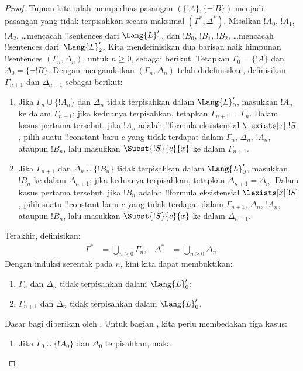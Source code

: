 \documentclass[../../../include/open-logic-section]{subfiles}
\begin{document}
\begin{proof}
Tujuan kita ialah memperluas pasangan $(\{ !A \}, \{\lnot!B\})$ menjadi
pasangan yang tidak terpisahkan secara maksimal $(\Gamma^*, \Delta^*)$.
Misalkan $!A_0$, $!A_1$, $!A_2$, \dots mencacah !!{sentence}s dari
$\Lang{L}'_1$, dan $!B_0$, $!B_1$, $!B_2$, \dots mencacah
!!{sentence}s dari~$\Lang{L}'_2$. Kita mendefinisikan dua barisan naik
himpunan !!{sentence}s $(\Gamma_n, \Delta_n)$, untuk $n \ge 0$, sebagai
berikut. Tetapkan $\Gamma_0 = \{ !A\}$ dan $\Delta_0 = \{\lnot !B \}$.
Dengan mengandaikan $(\Gamma_n, \Delta_n)$ telah didefinisikan, definisikan
$\Gamma_{n+1}$ dan $\Delta_{n+1}$ sebagai berikut:
\begin{enumerate}
\item Jika $\Gamma_n \cup \{!A_n \}$ dan $\Delta_n$ tidak terpisahkan
  dalam $\Lang{L}'_0$, masukkan $!A_n$ ke dalam $\Gamma_{n+1}$; jika
  keduanya terpisahkan, tetapkan $\Gamma_{n+1}=\Gamma_n$. Dalam kasus pertama
  tersebut, jika
  $!A_n$ adalah !!{formula} eksistensial $\lexists[x][!S]$, pilih suatu
  !!{constant} baru $c$ yang tidak terdapat dalam $\Gamma_n$, $\Delta_n$,
  $!A_n$, ataupun $!B_n$, lalu masukkan $\Subst{!S}{c}{x}$ ke dalam
  $\Gamma_{n+1}$.
\item Jika $\Gamma_{n+1}$ dan $\Delta_n \cup \{!B_n \}$ tidak
  terpisahkan dalam $\Lang{L}'_0$, masukkan $!B_n$ ke dalam
  $\Delta_{n+1}$; jika keduanya terpisahkan, tetapkan
  $\Delta_{n+1}=\Delta_n$. Dalam kasus pertama tersebut, jika $!B_n$ adalah
  !!{formula}
  eksistensial $\lexists[x][!S]$, pilih suatu !!{constant} baru $c$ yang
  tidak terdapat dalam $\Gamma_{n+1}$, $\Delta_n$, $!A_n$, ataupun $!B_n$,
  lalu masukkan $\Subst{!S}{c}{x}$ ke dalam $\Delta_{n+1}$.
\end{enumerate}
Terakhir, definisikan:
\begin{align*}
  \Gamma^* & = \bigcup_{n\ge 0} \Gamma_n, &
  \Delta^* & = \bigcup_{n\ge 0} \Delta_n.
\end{align*}
Dengan induksi serentak pada $n$, kini kita dapat membuktikan:
\begin{enumerate}
\item{} $\Gamma_n$ dan $\Delta_n$ tidak terpisahkan dalam
  $\Lang{L}'_0$;
\item{} $\Gamma_{n+1}$ dan $\Delta_n$ tidak terpisahkan
  dalam $\Lang{L}'_0$.
\end{enumerate}
Dasar bagi  diberikan oleh . Untuk bagian
, kita perlu membedakan tiga kasus:
\begin{enumerate}
\item Jika $\Gamma_0 \cup \{!A_0 \}$ dan $\Delta_0$ terpisahkan, maka

\end{enumerate}
\end{proof}
\end{document}
